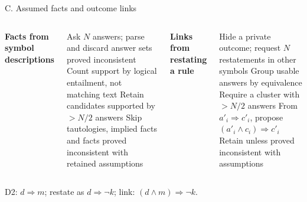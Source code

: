 \documentclass[aspectratio=169,11pt]{beamer}
\begin{document}
\begin{frame}[noframenumbering,label=app-c]{C. Assumed facts and outcome links}
\backuptext
\begin{columns}[T,onlytextwidth]
\textbf{Facts from symbol descriptions}
\begin{algorithmic}[1]
\State Ask $N$ answers; parse and discard answer sets proved inconsistent
\State Count support by logical entailment, not matching text
\State Retain candidates supported by $>N/2$ answers
\State Skip tautologies, implied facts and facts proved inconsistent with retained assumptions
\end{algorithmic}
\textbf{Links from restating a rule}
\begin{algorithmic}[1]
\State Hide a private outcome; request $N$ restatements in other symbols
\State Group usable answers by equivalence
\State Require a cluster with $>N/2$ answers
\State From $a'_i\Rightarrow c'_i$, propose $(a'_i\land c_i)\Rightarrow c'_i$
\State Retain unless proved inconsistent with assumptions
\end{algorithmic}
\end{columns}
\vspace{1mm}
D2: $d\Rightarrow m$; restate as $d\Rightarrow\neg k$; link: $(d\land m)\Rightarrow\neg k$.
\par\vspace{0.25mm}
\end{frame}
\end{document}
